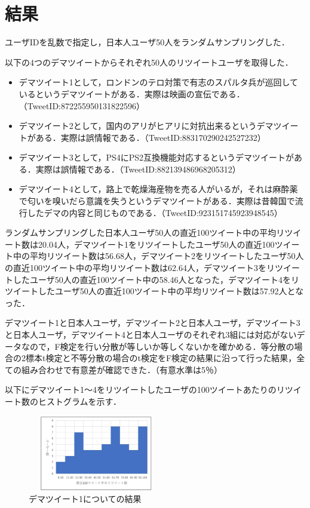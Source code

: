 \documentclass[uplatex,twocolumn]{jsarticle}
\begin{document}
\section{結果}
ユーザIDを乱数で指定し，日本人ユーザ50人をランダムサンプリングした．

以下の4つのデマツイートからそれぞれ50人のリツイートユーザを取得した．
\begin{itemize}
 \item デマツイート1として，ロンドンのテロ対策で有志のスパルタ兵が巡回しているというデマツイートがある．実際は映画の宣伝である．（TweetID:872255950131822596）
 \item デマツイート2として，国内のアリがヒアリに対抗出来るというデマツイートがある．実際は誤情報である．（TweetID:883170290242527232）
 \item デマツイート3として，PS4にPS2互換機能対応するというデマツイートがある．実際は誤情報である．（TweetID:882139486968205312）
 \item デマツイート4として，路上で乾燥海産物を売る人がいるが，それは麻酔薬で匂いを嗅いだら意識を失うというデマツイートがある．実際は昔韓国で流行したデマの内容と同じものである．（TweetID:923151745923948545）
\end{itemize}

ランダムサンプリングした日本人ユーザ50人の直近100ツイート中の平均リツイート数は20.04人，デマツイート1をリツイートしたユーザ50人の直近100ツイート中の平均リツイート数は56.68人，デマツイート2をリツイートしたユーザ50人の直近100ツイート中の平均リツイート数は62.64人，デマツイート3をリツイートしたユーザ50人の直近100ツイート中の58.46人となった，デマツイート4をリツイートしたユーザ50人の直近100ツイート中の平均リツイート数は57.92人となった．

デマツイート1と日本人ユーザ，デマツイート2と日本人ユーザ，デマツイート3と日本人ユーザ，デマツイート4と日本人ユーザのそれぞれ3組には対応がないデータなので，F検定を行い分散が等しいか等しくないかを確かめる．等分散の場合の2標本t検定と不等分散の場合のt検定をF検定の結果に沿って行った結果，全ての組み合わせで有意差が確認できた．（有意水準は5％）

以下にデマツイート1～4をリツイートしたユーザの100ツイートあたりのリツイート数のヒストグラムを示す．

\begin{figure}[htbp]
\centering
\includegraphics[clip,width=6.0cm,height=3.3cm]{d1.pdf}
\caption{デマツイート1についての結果}
\label{ヒストグラム1}
\end{figure}
\end{document}
